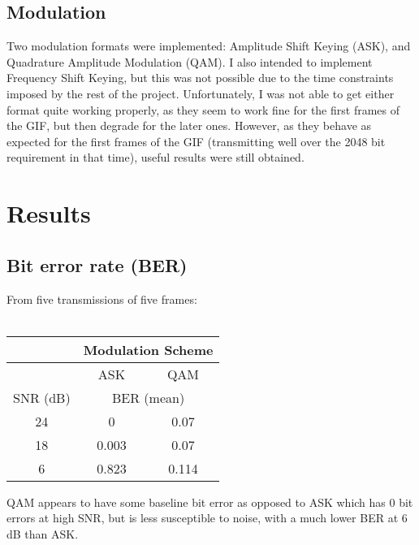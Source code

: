 \documentclass{article}
\begin{document}
\subsection{Modulation}
Two modulation formats were implemented: Amplitude Shift Keying (ASK), and Quadrature Amplitude Modulation (QAM). I also intended to implement Frequency Shift Keying, but this was not possible due to the time constraints imposed by the rest of the project. Unfortunately, I was not able to get either format quite working properly, as they seem to work fine for the first frames of the GIF, but then degrade for the later ones. However, as they behave as expected for the first frames of the GIF (transmitting well over the 2048 bit requirement in that time), useful results were still obtained.

\section{Results}
\subsection{Bit error rate (BER)}
From five transmissions of five frames:
\\\\
\begin{tabular}{|c|c|c|}
    \hline
     & \multicolumn{2}{c|}{Modulation Scheme} \\ \hline
     & ASK & QAM \\\hline
    SNR (dB) & \multicolumn{2}{c|}{BER (mean)} \\ \hline
    24 & 0 & 0.07 \\
    18 & 0.003 & 0.07 \\
    6 & 0.823 & 0.114\\
    \hline
\end{tabular}

QAM appears to have some baseline bit error as opposed to ASK which has 0 bit errors at high SNR, but is less susceptible to noise, with a much lower BER at 6 dB than ASK. 
\end{document}
